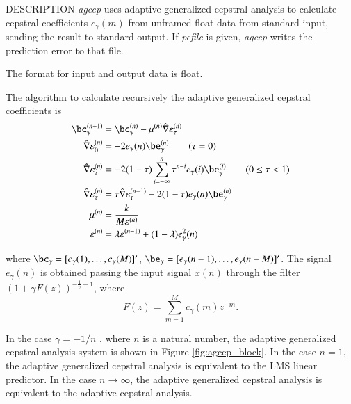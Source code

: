 \begin{qsection}{DESCRIPTION}
	{\em agcep} uses adaptive generalized cepstral analysis
	\cite{ref:agcep-IEICEtaikai90s}
	to calculate cepstral coefficients $c_\gamma(m)$ 
	from unframed float data from standard input,
	sending the result to standard output. 
	If {\em pefile} is given, 
	{\em agcep} writes the prediction error to that file.

	The format for input and output data is float.

	The algorithm to calculate recursively the
        adaptive generalized cepstral coefficients is 
\begin{align}
  \bc_\gamma^{(n+1)} &= \bc_\gamma^{(n)} 
     - \mu^{(n)} \hat{\nabla} \varepsilon_{\tau}^{(n)} \notag \\
  \hat{\nabla} \varepsilon_{0}^{(n)} &= -2 e_\gamma (n) \be_\gamma^{(n)}
  \qquad ( \tau = 0 ) \notag \\
  \hat{\nabla} \varepsilon_{\tau}^{(n)} &= -2 (1 - \tau) \sum_{i=-\infty}^{n}
  \tau^{n-i} e_\gamma (i) \be_\gamma^{(i)} \qquad ( 0 \le \tau < 1 ) \notag \\
  \hat{\nabla} \varepsilon_{\tau}^{(n)} &= \tau \hat{\nabla}  
  \varepsilon_{\tau}^{(n-1)} - 2 (1 - \tau) e_\gamma (n) \be_\gamma^{(n)}
  \notag \\
  \mu^{(n)} &= \frac{k}{M \varepsilon^{(n)}} \notag \\
  \varepsilon^{(n)} &= \lambda \varepsilon^{(n-1)}
     + (1-\lambda)e_\gamma^2(n) \notag
\end{align}	

where
$\bc_\gamma = [c_\gamma(1),\ldots,c_\gamma(M)]'$,
$\be_\gamma = [e_\gamma(n-1),\ldots,e_\gamma(n-M)]'$.
The signal $e_\gamma(n)$ is obtained passing the input signal
 $x(n)$ through the filter $(1+\gamma F(z))^{-\frac{1}{\gamma}-1}$,
where 
\begin{displaymath}
F(z) = \sum_{m=1}^{M}c_\gamma(m)z^{-m}.
\end{displaymath}
\par
In the case $\gamma = -1/n$ , where $n$ is a natural number,
the adaptive generalized cepstral analysis system is shown in 
Figure \ref{fig:agcep_block}.
In the case $n=1$, the adaptive generalized cepstral
analysis is equivalent to the LMS linear predictor.
In the case $n \rightarrow \infty$,
the adaptive generalized cepstral
analysis is equivalent to the 
adaptive cepstral analysis.


\end{qsection}
